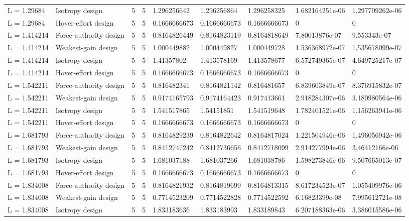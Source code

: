 \begin{tabular}{@{}lllllllll@{}}
L = 1.29684 & Isotropy design & 5 & 5 & 1.296256642 & 1.296256864 & 1.296258325 & 1.682164251e-06 & 1.297709262e-06 \\
L = 1.29684 & Hover-effort design & 5 & 5 & 0.1666666673 & 0.1666666673 & 0.1666666673 & 0 & 0 \\
L = 1.414214 & Force-authority design & 5 & 5 & 0.8164826449 & 0.8164823119 & 0.8164818649 & 7.80013876e-07 & 9.553343e-07 \\
L = 1.414214 & Weakest-gain design & 5 & 5 & 1.000449882 & 1.000449827 & 1.000449728 & 1.536368972e-07 & 1.535678099e-07 \\
L = 1.414214 & Isotropy design & 5 & 5 & 1.41357802 & 1.413578169 & 1.413578677 & 6.572749365e-07 & 4.649725217e-07 \\
L = 1.414214 & Hover-effort design & 5 & 5 & 0.1666666673 & 0.1666666673 & 0.1666666673 & 0 & 0 \\
L = 1.542211 & Force-authority design & 5 & 5 & 0.816482341 & 0.8164821142 & 0.816481657 & 6.839603849e-07 & 8.376915832e-07 \\
L = 1.542211 & Weakest-gain design & 5 & 5 & 0.9174165793 & 0.9174164423 & 0.917413661 & 2.918284307e-06 & 3.180980564e-06 \\
L = 1.542211 & Isotropy design & 5 & 5 & 1.541517865 & 1.54151851 & 1.541519648 & 1.782401521e-06 & 1.156263941e-06 \\
L = 1.542211 & Hover-effort design & 5 & 5 & 0.1666666673 & 0.1666666673 & 0.1666666673 & 0 & 0 \\
L = 1.681793 & Force-authority design & 5 & 5 & 0.8164829239 & 0.8164822642 & 0.8164817024 & 1.221504946e-06 & 1.496056942e-06 \\
L = 1.681793 & Weakest-gain design & 5 & 5 & 0.8412747242 & 0.8412736656 & 0.8412718099 & 2.914277994e-06 & 3.46412166e-06 \\
L = 1.681793 & Isotropy design & 5 & 5 & 1.681037188 & 1.681037266 & 1.681038786 & 1.598273846e-06 & 9.507665013e-07 \\
L = 1.681793 & Hover-effort design & 5 & 5 & 0.1666666673 & 0.1666666673 & 0.1666666673 & 0 & 0 \\
L = 1.834008 & Force-authority design & 5 & 5 & 0.8164821932 & 0.8164819699 & 0.8164813315 & 8.617234523e-07 & 1.055409976e-06 \\
L = 1.834008 & Weakest-gain design & 5 & 5 & 0.7714523209 & 0.7714522828 & 0.7714522592 & 6.16823399e-08 & 7.995612721e-08 \\
L = 1.834008 & Isotropy design & 5 & 5 & 1.833183636 & 1.833183993 & 1.833189843 & 6.207188363e-06 & 3.386015586e-06 \\

\end{tabular}
